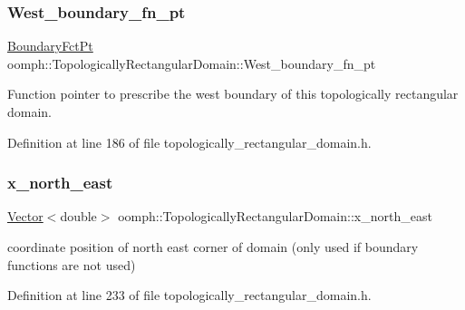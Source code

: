 \subsubsection{\texorpdfstring{West\+\_\+boundary\+\_\+fn\+\_\+pt}{West\_boundary\_fn\_pt}}
{\footnotesize\ttfamily \hyperlink{classoomph_1_1TopologicallyRectangularDomain_a8b2e24f5500d86c93aef509c5410e7cc}{Boundary\+Fct\+Pt} oomph\+::\+Topologically\+Rectangular\+Domain\+::\+West\+\_\+boundary\+\_\+fn\+\_\+pt\hspace{0.3cm}{\ttfamily [private]}}



Function pointer to prescribe the west boundary of this topologically rectangular domain. 



Definition at line 186 of file topologically\+\_\+rectangular\+\_\+domain.\+h.

\mbox{\label{classoomph_1_1TopologicallyRectangularDomain_aea8383a0d263080b49c3cbaee4af7833}} 
\subsubsection{\texorpdfstring{x\+\_\+north\+\_\+east}{x\_north\_east}}
{\footnotesize\ttfamily \hyperlink{classoomph_1_1Vector}{Vector}$<$double$>$ oomph\+::\+Topologically\+Rectangular\+Domain\+::x\+\_\+north\+\_\+east\hspace{0.3cm}{\ttfamily [private]}}



coordinate position of north east corner of domain (only used if boundary functions are not used) 



Definition at line 233 of file topologically\+\_\+rectangular\+\_\+domain.\+h.

\mbox{\label{classoomph_1_1TopologicallyRectangularDomain_a2e58acf65777d33e580b4953b7753b45}} 
